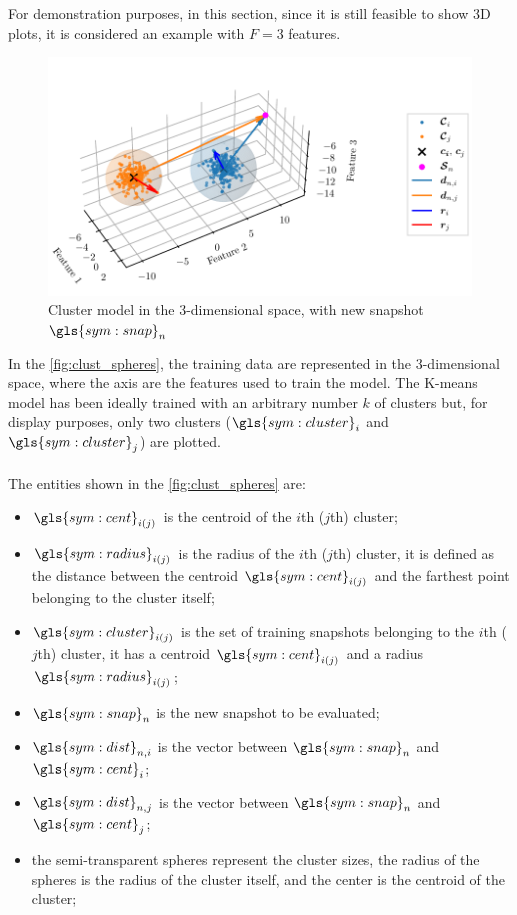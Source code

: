 For demonstration purposes, in this section, since it is still feasible to show 3D plots, it is considered an example with ${F}=3$ features.

\begin{figure}[htbp]
  \centering
  \includegraphics[width=\textwidth]{images/Spheres_2.pdf}
  \caption{Cluster model in the $3$-dimensional space, with new snapshot $\gls{sym:snap}_n$}
  \label{fig:clust_spheres}
\end{figure}

In the \autoref{fig:clust_spheres}, the training data are represented in the $3$-dimensional space, where the axis are the features used to train the model. The K-means model has been ideally trained with an arbitrary number $k$ of clusters but, for display purposes, only two clusters  ($\gls{sym:cluster}_i$ and $\gls{sym:cluster}_j$) are plotted.
\paragraph*{}
The entities shown in the \autoref{fig:clust_spheres} are:
\begin{itemize}
  \item $\gls{sym:cent}_{i(j)}$ is the centroid of the $i$th ($j$th) cluster;
  \item $\gls{sym:radius}_{i(j)}$ is the radius of the $i$th ($j$th) cluster, it is defined as the distance between the centroid $\gls{sym:cent}_{i(j)}$ and the farthest point belonging to the cluster itself;
  \item $\gls{sym:cluster}_{i(j)}$ is the set of training snapshots belonging to the $i$th ($j$th) cluster, it has a centroid $\gls{sym:cent}_{i(j)}$ and a radius $\gls{sym:radius}_{i(j)}$;
  \item $\gls{sym:snap}_n$ is the new snapshot to be evaluated;
  \item $\gls{sym:dist}_{n,i}$ is the vector between $\gls{sym:snap}_n$ and $\gls{sym:cent}_i$;
  \item $\gls{sym:dist}_{n,j}$ is the vector between $\gls{sym:snap}_n$ and $\gls{sym:cent}_j$;
  \item the semi-transparent spheres represent the cluster sizes, the radius of the spheres is the radius of the cluster itself, and the center is the centroid of the cluster;
\end{itemize}




